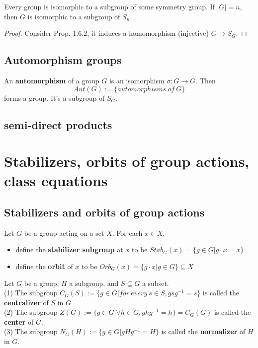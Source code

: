 \documentclass[11pt,fleqn]{book} %
\begin{document}
\begin{CJK}{UTF8}{gkai}
\begin{theorem}
	[Cayley] Every group is isomorphic to a subgroup of some symmetry group. If $|G| = n$, then $G$ is isomorphic to a subgroup of $S_n$.
\end{theorem}
\begin{proof}
	Consider Prop. 1.6.2, it induces a homomorphism (injective) $G \to S_G$.
\end{proof}

\subsection{Automorphism groups}
\begin{definition}
	An {\bf automorphism} of a group $G$ is an isomorphism $\sigma: G \to G$. Then 
	\[Aut(G) := \{automorphisms \ of \ G\}\] 
	forms a group. It's a subgroup of $S_G$.
\end{definition}

\subsection{semi-direct products}

\section{Stabilizers, orbits of group actions, class equations}
\subsection{Stabilizers and orbits of group actions}
\begin{definition}
	Let $G$ be a group acting on a set $X$. For each $x \in X$,
	\begin{itemize}
		\item define the {\bf stabilizer subgroup} at $x$ to be $Stab_G(x)=\{g\in G| g\cdot x = x\}$
		\item define the {\bf orbit} of $x$ to be $Orb_G(x) = \{g\cdot x | g \in G\}\subseteq X$ 	
	\end{itemize}
\end{definition}

\begin{definition}
	 Let $G$ be a group, $H$ a subgroup, and $S \subseteq G$ a subset.  \\
	(1) The subgroup $C_G(S) :=\{g\in G | for \ every \ s \in S, gsg^{-1} = s\}$ is called the {\bf centralizer} of $S$ in $G$\\
	(2) The subgroup $Z(G) :=\{g\in G | \forall h \in G, ghg^{-1} = h\} = C_G(G)$ is called the {\bf center} of $G$. \\
	(3) The subgroup $N_G(H) := \{g \in G | gHg^{-1} = H\}$ is called the {\bf normalizer} of $H$ in $G$.
\end{definition}


\end{CJK}
\end{document}
